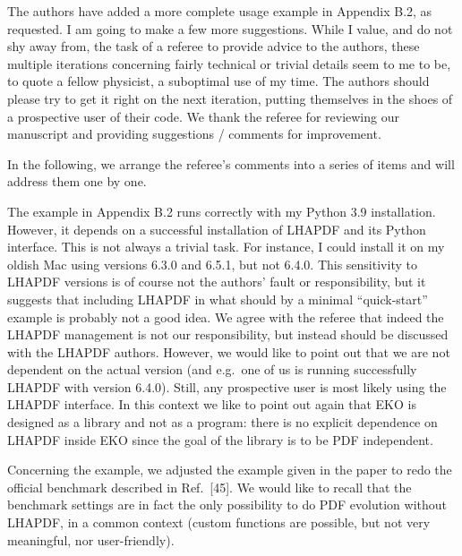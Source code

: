 \documentclass[a4paper,11pt]{article}
\newcounter{comment}[section]
\begin{document}
 


\begin{response}{
  The authors have added a more complete usage example in Appendix B.2, as
requested. I am going to make a few more suggestions. While I value, and do not
shy away  from, the task of a referee to provide advice to the authors, these
multiple iterations concerning fairly technical or trivial details seem to me to
be, to quote a fellow physicist, a suboptimal use of my time. The authors should
please try to get it right on the next iteration, putting themselves in the
shoes of a prospective user of their code.
}
We thank the referee for reviewing our manuscript and providing suggestions / comments for improvement.

In the following, we arrange the referee's comments into a series of items and 
will address them one by one.
\end{response}

\begin{response}{
  The example in Appendix B.2 runs correctly with my Python 3.9 installation.
  However, it depends on a successful  installation of LHAPDF and its Python
  interface. This is not always a trivial task. For instance, I could install it
  on my oldish Mac using versions 6.3.0 and 6.5.1, but not 6.4.0. This sensitivity
  to LHAPDF versions is of course not the authors' fault or responsibility, but it
  suggests that including LHAPDF in what should by a minimal ``quick-start''
  example is probably not a good idea.
}
We agree with the referee that indeed the LHAPDF management is not our responsibility, but
instead should be discussed with the LHAPDF authors. However, we would like to point out that
we are not dependent on the actual version (and e.g.\ one of us is running successfully LHAPDF with version 6.4.0).
Still, any prospective user is most likely using the LHAPDF interface. In this context we like to point out again
that EKO is designed as a library and not as a program: there is no explicit dependence on LHAPDF inside EKO since the goal of the
library is to be PDF independent.

Concerning the example, we adjusted the example given in the paper to redo the official benchmark described in
Ref.~[45]. We would like to recall that the benchmark settings are in fact the only possibility to do
PDF evolution without LHAPDF, in a common context (custom functions are possible, but not very meaningful, nor user-friendly).
\end{response}
\end{document}
